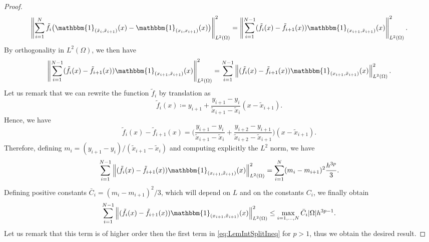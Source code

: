 \documentclass{siamart1116}
\numberwithin{theorem}{section}
\DeclarePairedDelimiter{\abs}{\lvert}{\rvert}
\newcommand{\norm}[1]{\left\lVert#1\right\rVert}
\newcommand{\defeq}{\coloneqq}
\newcommand{\ind}[1]{\mathbbm{1}_{#1}}
\begin{document}
\begin{proof}
\begin{equation}
	\norm{\sum_{i = 1}^{N}\tilde f_i \big(\ind{(\tilde x_i,\tilde x_{i+1})}(x) - \ind{(x_i, x_{i+1})}(x)\big)}^2_{L^2(\Omega)} = \norm{\sum_{i=1}^{N-1}(\tilde f_i(x) - \tilde f_{i+1}(x))\ind{(x_{i+1}, \tilde x_{i+1})}(x)}^2_{L^2(\Omega)}. \\
\end{equation}
By orthogonality in $L^2(\Omega)$, we then have
\begin{equation}
	\norm{\sum_{i=1}^{N-1}(\tilde f_i(x) - \tilde f_{i+1}(x))\ind{(x_{i+1}, \tilde x_{i+1})}(x)}^2_{L^2(\Omega)} = \sum_{i=1}^{N-1}\norm{(\tilde f_i(x) - \tilde f_{i+1}(x))\ind{(x_{i+1}, \tilde x_{i+1})}(x)}^2_{L^2(\Omega)}.
\end{equation}
Let us remark that we can rewrite the function $\tilde f_i$ by translation as
\begin{equation}
	\tilde f_i(x) \defeq y_{i+1} + \frac{y_{i+1} - y_i}{\tilde x_{i+1} - \tilde x_i}(x - \tilde x_{i+1}).
\end{equation}
Hence, we have
\begin{equation}
	\tilde f_i(x) - \tilde f_{i+1}(x) = \Big(\frac{y_{i+1} - y_i}{\tilde x_{i+1} - \tilde x_i} + \frac{y_{i+2} - y_{i+1}}{\tilde x_{i+2} - \tilde x_{i+1}} \Big)(x - \tilde x_{i+1}).
\end{equation}
Therefore, defining $m_i = (y_{i+1} - y_i)/(\tilde x_{i+1} - \tilde x_i)$ and computing explicitly the $L^2$ norm, we have
\begin{equation}
	\sum_{i=1}^{N-1}\norm{(\tilde f_i(x) - \tilde f_{i+1}(x))\ind{(x_{i+1}, \tilde x_{i+1})}(x)}^2_{L^2(\Omega)} = \sum_{i=1}^N (m_i - m_{i+1})^2 \frac{h^{3p}}{3}.
\end{equation}
Defining positive constants $\bar C_i = (m_i - m_{i+1})^2 / 3$, which will depend on $L$ and on the constants $C_i$, we finally obtain
\begin{equation}
	\sum_{i=1}^{N-1}\norm{(\tilde f_i(x) - \tilde f_{i+1}(x))\ind{(x_{i+1}, \tilde x_{i+1})}(x)}^2_{L^2(\Omega)} \leq \max_{i = 1, \ldots, N} \bar C_i \abs{\Omega} h^{3p-1}.
\end{equation}
Let us remark that this term is of higher order then the first term in \eqref{eq:LemIntSplitIneq} for $p > 1$, thus we obtain the desired result.
\end{proof}
\end{document}
